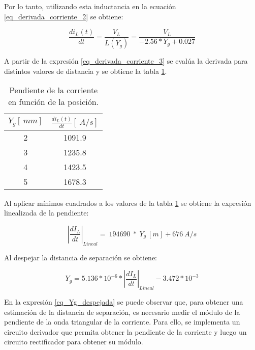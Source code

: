 Por lo tanto, utilizando esta inductancia en la ecuación \ref{eq_derivada_corriente_2} se obtiene:

\begin{equation} \label{eq_derivada_corriente_3}
	\frac{di_L(t)}{dt}= \frac{V_L}{L(Y_g)}=\frac{V_L}{-2.56*Y_{g}+0.027}
\end{equation}

A partir de la expresión \ref{eq_derivada_corriente_3} se evalúa la derivada para distintos valores de distancia y se obtiene la tabla \ref{tab_derivada_linealizada}.

\begin{table}[H]
	\begin{center}
		\begin{tabular}{| c | c |}
			\hline
			$Y_g[\:mm]$ & $\frac{di_L(t)}{dt} [\:A/s]$\\ \hline
			2 & 1091.9 \\ \hline 
			3 & 1235.8 \\ \hline 
			4 & 1423.5 \\ \hline 
			5 & 1678.3 \\ \hline 
		\end{tabular}
		\caption{Pendiente de la corriente en función de la posición.}
		\label{tab_derivada_linealizada}
	\end{center}
\end{table}

Al aplicar mínimos cuadrados a los valores de la tabla \ref{tab_derivada_linealizada} se obtiene la expresión linealizada de la pendiente:

\begin{equation} \label{eq_di-dt_lineal}
	{\left|\frac{{dI}_L}{dt}\right|}_{Lineal}=\ 194690\ *\ Y_g\:[m]+676\:A/s
\end{equation}

Al despejar la distancia de separación se obtiene:

\begin{equation} \label{eq_Yg_despejada}
	Y_g=5.136*10^{-6}*{\left|\frac{{dI}_L}{dt}\right|}_{Lineal} - 3.472*10^{-3}
\end{equation}


En la expresión \ref{eq_Yg_despejada} se puede observar que, para obtener una estimación de la distancia de separación, es necesario medir el módulo de la pendiente de la onda triangular de la corriente. Para ello, se implementa un circuito derivador que permita obtener la pendiente de la corriente y luego un circuito rectificador para obtener su módulo.

